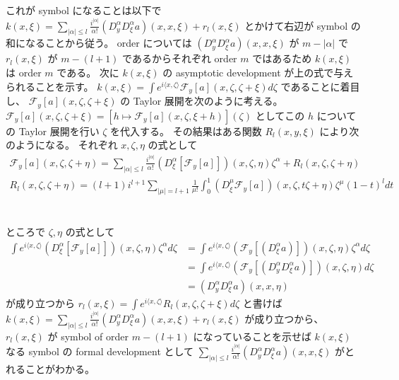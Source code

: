 \begin{Proof}
\itemprof
  これが symbol になることは以下で \(k(x,\xi) = \sum_{\lvert \alpha \rvert \leq l} \frac{i^{\lvert \alpha \rvert}}{\alpha !} (D^\alpha_y D^\alpha_\xi a)(x,x,\xi) + r_l(x,\xi)\) とかけて右辺が symbol の和になることから従う。
  order については \((D^\alpha_y D^\alpha_\xi a)(x,x,\xi)\) が \(m - \lvert \alpha \rvert\) で \(r_l(x,\xi)\) が \(m - (l + 1)\) であるからそれぞれ order \(m\) ではあるため \(k(x,\xi)\) は order \(m\) である。
\itemthen
  次に \(k(x,\xi)\) の asymptotic development が上の式で与えられることを示す。
  \(k(x,\xi) = \int e^{i \langle x , \zeta \rangle} \mathscr{F}_y[a](x , \zeta , \zeta + \xi) d \zeta\) であることに着目し、 \(\mathscr{F}_y[a](x , \zeta , \zeta + \xi)\) の Taylor 展開を次のように考える。
  \(\mathscr{F}_y[a](x , \zeta , \zeta + \xi) = [h \mapsto \mathscr{F}_y[a](x , \zeta , \xi + h)](\zeta)\) としてこの \(h\) についての Taylor 展開を行い \(\zeta\) を代入する。
  その結果はある関数 \(R_l(x,y,\xi)\) により次のようになる。
  それぞれ \(x , \zeta , \eta\) の式として
  \begin{align*}
    \mathscr{F}_y[a](x , \zeta , \zeta + \eta) = \sum_{\lvert \alpha \rvert \leq l} \frac{i^{\lvert \alpha \rvert}}{\alpha !}(D^\alpha_{\xi} [\mathscr{F}_y[a]])(x , \zeta , \eta) \zeta^\alpha + R_{l}(x , \zeta , \zeta + \eta) \\
    R_l(x , \zeta , \zeta + \eta) = (l + 1)i^{l + 1} \sum_{\lvert \mu \rvert = l + 1} \frac{1}{\mu !} \int_0^1 (D^\mu_\xi \mathscr{F}_y[a])(x , \zeta , t \zeta + \eta) \zeta^\mu (1 - t)^l dt
  \end{align*}
  \\ \ADMIT \\
  ところで \(\zeta , \eta\) の式として
  \begin{align*}
    \int e^{i \langle x ,\zeta \rangle} (D^\alpha_\xi[\mathscr{F}_y[a]])(x,\zeta,\eta)\zeta^\alpha d\zeta
    &= \int e^{i \langle x ,\zeta \rangle} (\mathscr{F}_y[(D^\alpha_\xi a)])(x,\zeta,\eta)\zeta^\alpha d\zeta \\
    &= \int e^{i \langle x ,\zeta \rangle} (\mathscr{F}_y[(D^\alpha_y D^\alpha_\xi a)])(x,\zeta,\eta) d\zeta \\
    &= (D^\alpha_y D^\alpha_\xi a)(x,x,\eta)
  \end{align*}
  が成り立つから \(r_l(x,\xi) = \int e^{i \langle x , \zeta \rangle} R_l(x,\zeta,\zeta + \xi) d\zeta\) と書けば \(k(x,\xi) = \sum_{\lvert \alpha \rvert \leq l} \frac{i^{\lvert \alpha \rvert}}{\alpha !} (D^\alpha_y D^\alpha_\xi a)(x,x,\xi) + r_l(x,\xi)\) が成り立つから、 \(r_l(x,\xi)\) が symbol of order \(m - (l + 1)\) になっていることを示せば \(k(x,\xi)\) なる symbol の formal development として \(\sum_{\lvert \alpha \rvert \leq l} \frac{i^{\lvert \alpha \rvert}}{\alpha !} (D^\alpha_y D^\alpha_\xi a)(x,x,\xi)\) がとれることがわかる。
\end{Proof}

